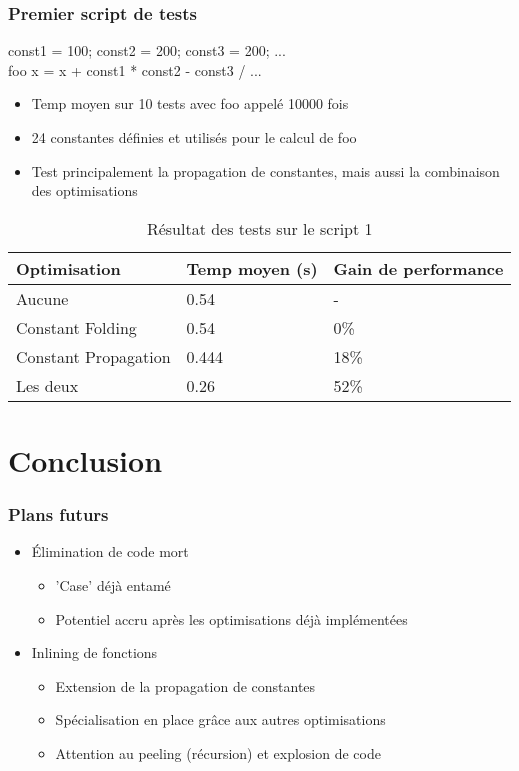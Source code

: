 \documentclass{beamer}
\begin{document}
\begin{frame}
    \frametitle{Premier script de tests}
    const1 = 100; const2 = 200; const3 = 200; ...\\
    foo x = x + const1 * const2 - const3 / ...\\
    \bigskip
    \begin{itemize}
      \item Temp moyen sur 10 tests avec foo appelé 10000 fois
      \item 24 constantes définies et utilisés pour le calcul de foo
      \item Test principalement la propagation de constantes, mais aussi la
        combinaison des optimisations
    \end{itemize}

    \begin{table}
      \begin{tabular}{l l l}
        \toprule
        \textbf{Optimisation} & \textbf{Temp moyen (s)} & \textbf{Gain de performance}\\
        \midrule
        Aucune & 0.54 & - \\
        Constant Folding & 0.54 & 0\% \\
        Constant Propagation & 0.444 & 18\% \\
        Les deux & 0.26 & 52\% \\
        \bottomrule
      \end{tabular}
      \caption{Résultat des tests sur le script 1}
    \end{table}
\end{frame}
\section{Conclusion}
\begin{frame}
\frametitle{Plans futurs}

  \begin{itemize}
    \item Élimination de code mort
      \begin{itemize}
        \item 'Case' déjà entamé
        \item Potentiel accru après les optimisations déjà implémentées
      \end{itemize}
    \bigskip
    \pause
    \item Inlining de fonctions
      \begin{itemize}
        \item Extension de la propagation de constantes
        \item Spécialisation en place grâce aux autres optimisations
        \item Attention au peeling (récursion) et explosion de code
      \end{itemize}
  \end{itemize}
\end{frame}
\end{document}

